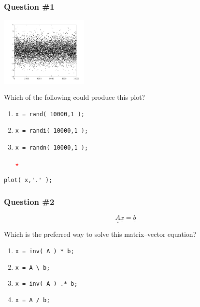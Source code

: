 \documentclass[11pt]{beamer}
\newcommand{\correctstar}{{\Large\textcolor{red}{$\star$}}}
\begin{document}
\begin{frame}[fragile]
  \frametitle{Question \#1}
  \Enlarge

  \includegraphics[width=0.33\textwidth]{./img/plot-normal.png}

Which of the following could produce this plot?

  \begin{enumerate}[label=\Alph*]
    \item
      \begin{Verbatim}
x = rand( 10000,1 );
      \end{Verbatim}
    \item
      \begin{Verbatim}
x = randi( 10000,1 );
      \end{Verbatim}
    \item
    \begin{Verbatim}
x = randn( 10000,1 );
    \end{Verbatim}
    \correctstar
  \end{enumerate}
  \begin{Verbatim}
plot( x,'.' );
  \end{Verbatim}
\end{frame}

\begin{frame}[fragile]
  \frametitle{Question \#2}
  \Enlarge

  $$
\underline{\underline{A}} \underline{x} = \underline{b}
  $$

Which is the preferred way to solve this matrix--vector equation?

  \begin{enumerate}[label=\Alph*]
    \item  \texttt{x = inv( A ) * b;}
    \item  \texttt{x = A \textbackslash ~b;}
    \item  \texttt{x = inv( A ) .* b;}
    \item  \texttt{x = A / b;}
  \end{enumerate}
\end{frame}
\end{document}
